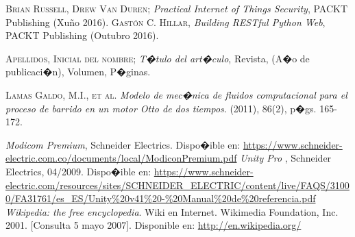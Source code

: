 \documentclass[11pt,twoside]{book}
\begin{document}
\begin{thebibliography}{99}

 \textsc{Brian Russell, Drew Van Duren}; \textit{Practical Internet of Things Security}, PACKT Publishing (Xuño 2016).
 \textsc{Gastón C. Hillar}, \emph{Building RESTful Python Web}, PACKT Publishing (Outubro 2016).

 \textsc{Apellidos, Inicial del nombre}; \emph{T�tulo del art�culo}, Revista, (A�o de publicaci�n), Volumen, P�ginas.

\bibitem{} \textsc{Lamas Galdo, M.I., et al.} \emph{Modelo de mec�nica de fluidos computacional para el proceso de barrido en un motor Otto de dos tiempos}. 
(2011), 86(2), p�gs. 165-172.

 \textit{Modicom Premium}, Schneider Electrics.
             Dispo�ible en: \url{https://www.schneider-electric.com.co/documents/local/ModiconPremium.pdf}
 \textit{Unity Pro }, Schneider Electrics, 04/2009.
             Dispo�ible en: \url{https://www.schneider-electric.com/resources/sites/SCHNEIDER_ELECTRIC/content/live/FAQS/31000/FA31761/es_ES/Unity%20v41%20-%20Manual%20de%20referencia.pdf}
\bibitem{} \emph{Wikipedia: the free encyclopedia}. Wiki en Internet. Wikimedia Foundation, Inc. 2001. [Consulta 5 mayo 2007]. 
           Disponible en: \url{http://en.wikipedia.org/}
					
\end{thebibliography}

\stopcontents[parts]

\cleardoublepage
\renewcommand{\documento}{ANEXOS}
\end{document}
